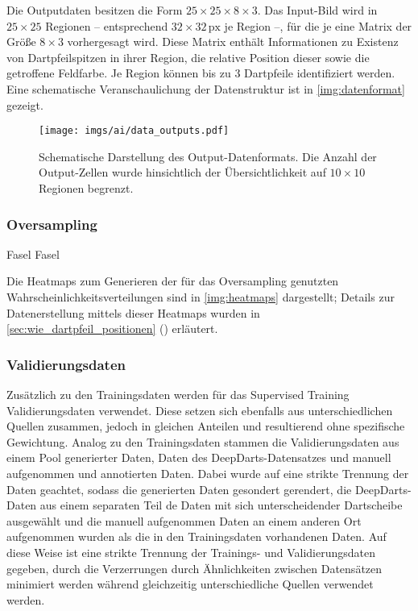 Die Outputdaten besitzen die Form $25 \times 25 \times 8 \times 3$. Das Input-Bild wird in $25 \times 25$ Regionen -- entsprechend $32 \times 32\,\text{px}$ je Region --, für die je eine Matrix der Größe $8 \times 3$ vorhergesagt wird. Diese Matrix enthält Informationen zu Existenz von Dartpfeilspitzen in ihrer Region, die relative Position dieser sowie die getroffene Feldfarbe. Je Region können bis zu 3 Dartpfeile identifiziert werden. Eine schematische Veranschaulichung der Datenstruktur ist in \autoref{img:datenformat} gezeigt.

\begin{figure}
    \centering
    \texttt{[image: imgs/ai/data\_outputs.pdf]}
    \caption{Schematische Darstellung des Output-Datenformats. Die Anzahl der Output-Zellen wurde hinsichtlich der Übersichtlichkeit auf $10 \times 10$ Regionen begrenzt.}
    \label{img:datenformat}
\end{figure}


\subsubsection{Oversampling}
\label{sec:oversampling}

Fasel Fasel

Die Heatmaps zum Generieren der für das Oversampling genutzten Wahrscheinlichkeitsverteilungen sind in \autoref{img:heatmaps} dargestellt; Details zur Datenerstellung mittels dieser Heatmaps wurden in \autoref{sec:wie_dartpfeil_positionen} () erläutert.


\subsubsection{Validierungsdaten}
\label{sec:validierungsdaten}

Zusätzlich zu den Trainingsdaten werden für das Supervised Training Validierungsdaten verwendet. Diese setzen sich ebenfalls aus unterschiedlichen Quellen zusammen, jedoch in gleichen Anteilen und resultierend ohne spezifische Gewichtung. Analog zu den Trainingsdaten stammen die Validierungsdaten aus einem Pool generierter Daten, Daten des DeepDarts-Datensatzes und manuell aufgenommen und annotierten Daten. Dabei wurde auf eine strikte Trennung der Daten geachtet, sodass die generierten Daten gesondert gerendert, die DeepDarts-Daten aus einem separaten Teil de Daten mit sich unterscheidender Dartscheibe ausgewählt und die manuell aufgenommen Daten an einem anderen Ort aufgenommen wurden als die in den Trainingsdaten vorhandenen Daten. Auf diese Weise ist eine strikte Trennung der Trainings- und Validierungsdaten gegeben, durch die Verzerrungen durch Ähnlichkeiten zwischen Datensätzen minimiert werden während gleichzeitig unterschiedliche Quellen verwendet werden.

